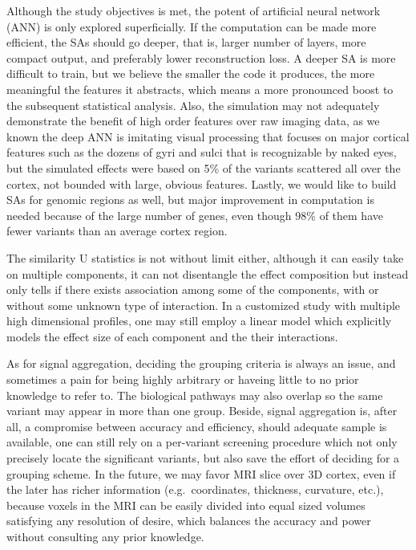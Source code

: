 Although the study objectives is met, the potent of artificial neural network (ANN) is only explored superficially. If the computation can be made more efficient, the SAs should go deeper, that is, larger number of layers, more compact output, and preferably lower reconstruction loss. A deeper SA is more difficult to train, but we believe the smaller the code it produces, the more meaningful the features it abstracts, which means a more pronounced boost to the subsequent statistical analysis. Also, the simulation may not adequately demonstrate the benefit of high order features over raw imaging data, as we known the deep ANN is imitating visual processing that focuses on major cortical features such as the dozens of gyri and sulci that is recognizable by naked eyes, but the simulated effects were based on 5\% of the variants scattered all over the cortex, not bounded with large, obvious features. Lastly, we would like to build SAs for genomic regions as well, but major improvement in computation is needed because of the large number of genes, even though 98\% of them have fewer variants than an average cortex region.

The similarity U statistics is not without limit either, although it can easily take on multiple components, it can not disentangle the effect composition but instead only tells if there exists association among some of the components, with or without some unknown type of interaction. In a customized study with multiple high dimensional profiles, one may still employ a linear model which explicitly models the effect size of each component and the their interactions.

As for signal aggregation, deciding the grouping criteria is always an issue, and sometimes a pain for being highly arbitrary or haveing little to no prior knowledge to refer to. The biological pathways may also overlap so the same variant may appear in more than one group. Beside, signal aggregation is, after all, a compromise between accuracy and efficiency, should adequate sample is available, one can still rely on a per-variant screening procedure which not only precisely locate the significant variants, but also save the effort of deciding for a grouping scheme. In the future, we may favor MRI slice over 3D cortex, even if the later has richer information (e.g.\ coordinates, thickness, curvature, etc.),  because voxels in the MRI can be easily divided into equal sized volumes satisfying any resolution of desire, which balances the accuracy and power without consulting any prior knowledge.


